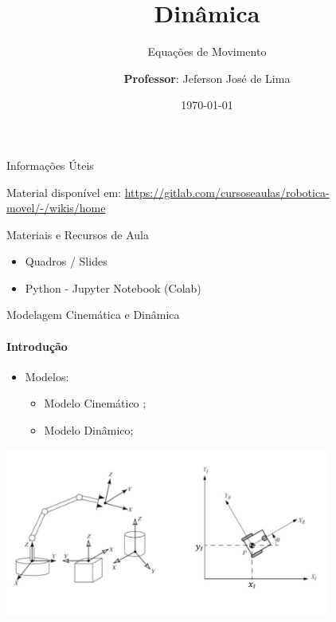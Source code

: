 \documentclass{beamer}
\title{Dinâmica}
\subtitle{Equações de Movimento}
\date{\today}
\author[Jeferson José de Lima]{
  \textbf{Professor}: Jeferson José de Lima}
\institute[UTFPR-PB]{Departamento de Informática (DAINF)}
\newcommand{\pausar}{ }
\newcommand{\cmark}{\textcolor{green}{\ding{51}}}%
\begin{document}
\maketitle

\begin{frame}{Informações Úteis}
    \begin{block}{Material disponível em:}
        \href{Robótica Móvel - Wiki}{https://gitlab.com/cursoseaulas/robotica-movel/-/wikis/home}
    \end{block}
    \pausar
    \pausar
    \begin{block}{Materiais e Recursos de Aula}
        \begin{itemize}
            \item Quadros / Slides
            \item Python - Jupyter Notebook (Colab)
        \end{itemize}
    \end{block}
    
\end{frame}


\begin{frame}{Modelagem Cinemática e Dinâmica}
    \framesubtitle{Introdução}
    \begin{itemize}
        \item Modelos:
              \begin{itemize}
                  \item Modelo Cinemático \cmark;
                  \item Modelo Dinâmico;
              \end{itemize}
    \end{itemize}
    \begin{center}
        \includegraphics[width=0.8\textwidth]{./images/mecanismos.jpg}
    \end{center}
\end{frame}
\end{document}
